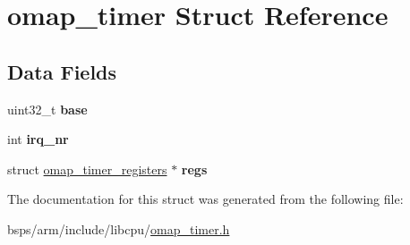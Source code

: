 \hypertarget{structomap__timer}{}\section{omap\+\_\+timer Struct Reference}
\label{structomap__timer}
\subsection*{Data Fields}
\begin{DoxyCompactItemize}
\item 
\mbox{\label{structomap__timer_a57d702c6a6f9d4de6ca106354a215e7a}} 
uint32\+\_\+t {\bfseries base}
\item 
\mbox{\label{structomap__timer_a022d8a641816815b868aa1dad7ca7b31}} 
int {\bfseries irq\+\_\+nr}
\item 
\mbox{\label{structomap__timer_a732c8fed9228757246b701a9a44b0ea2}} 
struct \mbox{\hyperlink{structomap__timer__registers}{omap\+\_\+timer\+\_\+registers}} $\ast$ {\bfseries regs}
\end{DoxyCompactItemize}


The documentation for this struct was generated from the following file\+:\begin{DoxyCompactItemize}
\item 
bsps/arm/include/libcpu/\mbox{\hyperlink{omap__timer_8h}{omap\+\_\+timer.\+h}}\end{DoxyCompactItemize}

